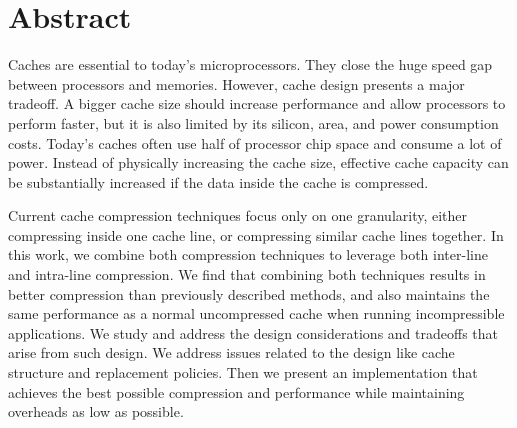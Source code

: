 
\chapter{Abstract}
Caches are essential to today's microprocessors. They close the huge speed gap between processors and memories. However, cache design presents a major tradeoff. A bigger cache size should increase performance and allow processors to perform faster, but it is also limited by its silicon, area, and power consumption costs. Today's caches often use half of processor chip space and consume a lot of power. Instead of physically increasing the cache size, effective cache capacity can be substantially increased if the data inside the cache is compressed.\par
Current cache compression techniques focus only on one granularity, either compressing inside one cache line, or compressing similar cache lines together. In this work, we combine both compression techniques to leverage both inter-line and intra-line compression. We find that combining both techniques results in better compression than previously described methods, and also maintains the same performance as a normal uncompressed cache when running incompressible applications. We study and address the design considerations and tradeoffs that arise from such design. We address issues related to the design like cache structure and replacement policies. Then we present an implementation that achieves the best possible compression and performance while maintaining overheads as low as possible.

